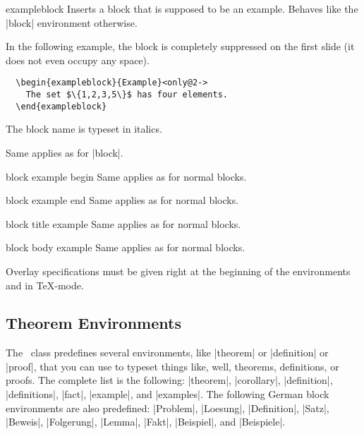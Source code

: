 \begin{environment}{{exampleblock}}
  Inserts a block that is supposed to be an example. Behaves like the
  |block| environment otherwise.

  \example In the following example, the block is completely
  suppressed on the first slide (it does not even occupy any space).
\begin{verbatim}
  \begin{exampleblock}{Example}<only@2->
    The set $\{1,2,3,5\}$ has four elements.
  \end{exampleblock}
\end{verbatim}

  \articlenote
  The block name is typeset in italics.

  \lyxnote
  Same applies as for |block|.

  \begin{element}{block example begin}\yes\no\no
    Same applies as for normal blocks.
  \end{element}

  \begin{element}{block example end}\yes\no\no
    Same applies as for normal blocks.
  \end{element}

  \begin{element}{block title example}\no\yes\yes
    Same applies as for normal blocks.
  \end{element}

  \begin{element}{block body example}\no\yes\yes
    Same applies as for normal blocks.
  \end{element}
\end{environment}

\lyxnote
Overlay specifications must be given right at the beginning of the
environments and in \TeX-mode.



\subsection{Theorem Environments}
\label{section-theorems}

The \beamer\ class predefines several environments, like |theorem| or
|definition| or |proof|, that you can use to typeset things like,
well, theorems, definitions, or proofs. The complete list is the
following:  |theorem|, |corollary|, |definition|,
|definitions|, |fact|, |example|, and |examples|. The following German
block environments are also predefined: |Problem|, |Loesung|,
|Definition|, |Satz|, |Beweis|, |Folgerung|, |Lemma|, |Fakt|,
|Beispiel|, and |Beispiele|.

